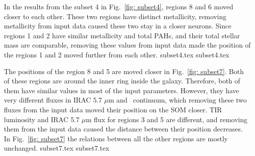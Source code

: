         In the results from the subset 4 in Fig.~\ref{fig: subset4}, regions 8 and 6 moved closer to each other. 
        These two regions have distinct metallicity, removing metallicity from input data caused these two stay in a closer neurons. 
        Since regions 1 and 2 have similar metallicity and total PAHs, and their total stellar mass are comparable, removing these values from input data made the position of the regions 1 and 2 moved further from each other. 
        {subset4.tex}
        {subset4.tex}
        
        The positions of the region 8 and 5 are moved closer in Fig.~\ref{fig: subset7}.
        Both of these regions are around the inner ring inside the galaxy.
        Therefore, both of them have similar values in most of the input parameters.
        However, they have very different fluxes in IRAC 5.7 $\mu$m and \sii~continuum, which removing these two fluxes from the input data moved their position on the SOM closer.
        TIR luminosity and IRAC 5.7 $\mu$m flux for regions 3 and 5 are different, and removing them from the input data caused the distance between their position decreases. 
        In Fig.~\ref{fig: subset7} the relations between all the other regions are mostly unchanged.
        {subset7.tex}
        {subset7.tex}
        